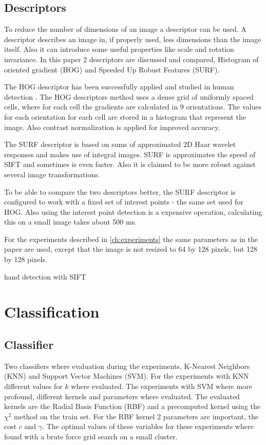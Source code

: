 \subsection*{Descriptors}
To reduce the number of dimensions of an image a descriptor can be used. A descriptor describes an image in, if properly used, less dimensions than the image itself. Also it can introduce some useful properties like scale and rotation invariance. In this paper 2 descriptors are discussed and compared, Histogram of oriented gradient\cite{NavneetDalal2006} (HOG) and Speeded Up Robust Features\cite{Bay2006} (SURF).

The HOG descriptor has been successfully applied and studied in human detection \cite{NavneetDalal2006, watanabe2009}. The HOG descriptors method uses a dense grid of uniformly spaced cells, where for each cell the gradients are calculated in 9 orientations. The values for each orientation for each cell are stored in a histogram that represent the image. Also contrast normalization is applied for improved accuracy.

The SURF descriptor is based on sums of approximated 2D Haar wavelet responses and makes use of integral images. SURF is approximates the speed of SIFT and sometimes is even faster\cite{Murillo2007, Valgren2010}. Also it is claimed to be more robust against several image transformations.

To be able to compare the two descriptors better, the SURF descriptor is configured to work with a fixed set of interest points - the same set used for HOG. Also using the interest point detection is a expensive operation, calculating this on a small image takes about 500 ms.

For the experiments described in \autoref{ch:experiments} the same parameters as in the \cite{watanabe2009} paper are used, except that the image is not resized to 64 by 128 pixels, but 128 by 128 pixels.

hand detection with SIFT\cite{Wang2007}

\section{Classification}

\subsection*{Classifier}
Two classifiers where evaluation during the experiments, K-Nearest Neighbors (KNN) and Support Vector Machines (SVM). For the experiments with KNN different values for $k$ where evaluated. The experiments with SVM where more profound, different kernels and parameters where evaluated. The evaluated kernels are the Radial Basis Function (RBF) and a precomputed kernel using the $\chi^2$ method on the train set. For the RBF kernel 2 parameters are important, the cost $c$ and $\gamma$. The optimal values of these variables for these experiments where found with a brute force grid search on a small cluster.

